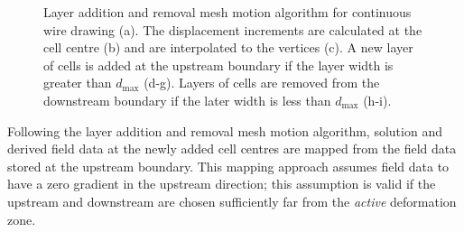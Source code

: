 \documentclass[sn-mathphys,Numbered]{sn-jnl}%
\begin{document}
\begin{figure}[tbh]
	\caption{Layer addition and removal mesh motion algorithm for continuous wire drawing (a). The displacement increments are calculated at the cell centre (b) and are interpolated to the vertices (c). A new layer of cells is added at the upstream boundary if the layer width is greater than $d_{\max}$ (d-g). Layers of cells are removed from the downstream boundary if the later width is less than $d_{\max}$ (h-i).}
	\label{fig:layerAddition}
\end{figure}

Following the layer addition and removal mesh motion algorithm, solution and derived field data at the newly added cell centres are mapped from the field data stored at the upstream boundary.
This mapping approach assumes field data to have a zero gradient in the upstream direction; this assumption is valid if the upstream and downstream are chosen sufficiently far from the \emph{active} deformation zone.
\end{document}
